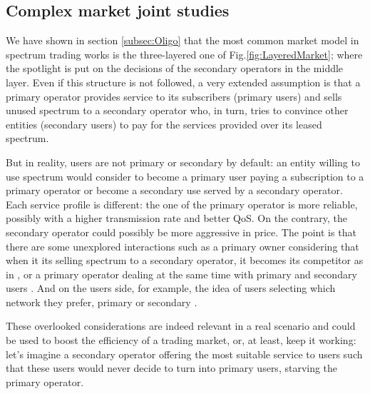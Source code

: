 \subsection{Complex market joint studies}
We have shown in section \ref{subsec:Oligo} that the most common market model in spectrum trading works is the three-layered one of Fig.\ref{fig:LayeredMarket}; where the spotlight is put on the decisions of the secondary operators in the middle layer. 
Even if this structure is not followed, a very extended assumption is that a primary operator provides service to its subscribers (primary users) and sells unused spectrum to a secondary operator who, in turn, tries to convince other entities (secondary users) to pay for the services provided over its leased spectrum. 

But in reality, users are not primary or secondary by default: an entity willing to use spectrum would consider to become a primary user paying a subscription to a primary operator or become a secondary use served by a secondary operator. 
Each service profile is different: the one of the primary operator is more reliable, possibly with a higher transmission rate and better QoS. 
On the contrary, the secondary operator could possibly be more aggressive in price. 
The point is that there are some unexplored interactions such as a primary owner considering that when it its selling spectrum to a secondary operator, it becomes its competitor as in \cite{ref:Guijarro2011}, or a primary operator dealing at the same time with primary and secondary users \cite{ref:Dixit2010}. 
And on the users side, for example, the idea of users selecting which network they prefer, primary or secondary \cite{ref:Elias2013}.

These overlooked considerations are indeed relevant in a real scenario and could be used to boost the efficiency of a trading market, or, at least, keep it working: let's imagine a secondary operator offering the most suitable service to users such that these users would never decide to turn into primary users, starving the primary operator. 



